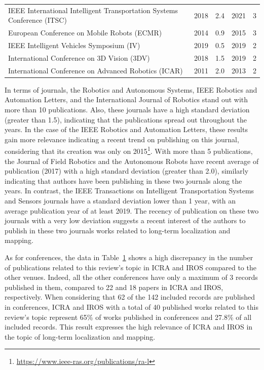 \begin{table}[!h]
{\begin{tabular}{p{}cccc}
IEEE International Intelligent Transportation Systems Conference (ITSC) & 2018 & 2.4 & 2021 & 3\\
European Conference on Mobile Robots (ECMR) & 2014 & 0.9 & 2015 & 3\\
IEEE Intelligent Vehicles Symposium (IV) & 2019 & 0.5 & 2019 & 2\\
International Conference on 3D Vision (3DV) & 2018 & 1.5 & 2019 & 2\\
International Conference on Advanced Robotics (ICAR) & 2011 & 2.0 & 2013 & 2\\
\hline
  \end{tabular}\label{tab:overview:publication:conference}%
  }
\end{table}

In terms of journals, the Robotics and Autonomous Systems, IEEE Robotics and Automation Letters, and the International Journal of Robotics stand out with more than 10 publications. Also, these journals have a high standard deviation (greater than 1.5), indicating that the publications spread out throughout the years.
In the case of the IEEE Robotics and Automation Letters, these results gain more relevance indicating a recent trend on publishing on this journal, considering that its creation was only on 2015\footnote{\url{https://www.ieee-ras.org/publications/ra-l}}.
With more than 5 publications, the Journal of Field Robotics and the Autonomous Robots have recent average of publication (2017) with a high standard deviation (greater than 2.0), similarly indicating that authors have been publishing in these two journals along the years.
In contrast, the IEEE Transactions on Intelligent Transportation Systems and Sensors journals have a standard deviation lower than 1 year, with an average publication year of at least 2019. The recency of publication on these two journals with a very low deviation suggests a recent interest of the authors to publish in these two journals works related to long-term localization and mapping.

As for conferences, the data in Table~\ref{tab:overview:publication:conference} shows a high discrepancy in the number of publications related to this review's topic in ICRA and IROS compared to the other venues. Indeed, all the other conferences have only a maximum of 3 records published in them, compared to 22 and 18 papers in ICRA and IROS, respectively. When considering that 62 of the 142 included records are published in conferences, ICRA and IROS with a total of 40 published works related to this review's topic represent 65\% of works published in conferences and 27.8\% of all included records. This result expresses the high relevance of ICRA and IROS in the topic of long-term localization and mapping.

